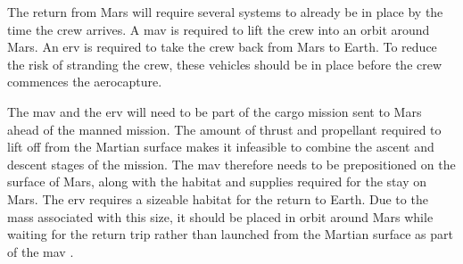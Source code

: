 The return from Mars will require several systems to already be in place by the time the crew arrives. A \gls{mav} is required to lift the crew into an orbit around Mars. An \gls{erv} is required to take the crew back from Mars to Earth. To reduce the risk of stranding the crew, these vehicles should be in place before the crew commences the aerocapture. 

The \gls{mav} and the \gls{erv} will need to be part of the cargo mission sent to Mars ahead of the manned mission. The amount of thrust and propellant required to lift off from the Martian surface makes it infeasible to combine the ascent and descent stages of the mission. The \gls{mav} therefore needs to be prepositioned on the surface of Mars, along with the habitat and supplies required for the stay on Mars. The \gls{erv} requires a sizeable habitat for the return to Earth. Due to the mass associated with this size, it should be placed in orbit around Mars while waiting for the return trip rather than launched from the Martian surface as part of the \gls{mav} \cite{hoffman1997}.